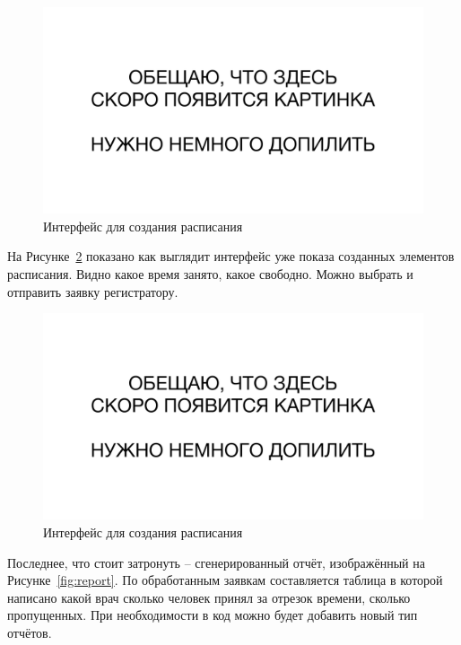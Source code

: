 \documentclass[a4paper,article]{article}
\begin{document}
\begin{sloppypar}
    \begin{figure}[h]
        \centering
        \includegraphics[width=0.8\linewidth]{UI. Пример создания расписания.png}        
        \caption{\centering Интерфейс для создания расписания}        
        \label{fig:createsched}        
    \end{figure}
    
    \newpage
    
    На Рисунке~\ref{fig:dosched} показано как выглядит интерфейс уже показа созданных элементов расписания. Видно какое время занято, какое свободно. Можно выбрать и отправить заявку регистратору.
    
    \begin{figure}[h]
        \centering
        \includegraphics[width=0.8\linewidth]{UI. Пример создания расписания.png}        
        \caption{\centering Интерфейс для создания расписания}        
        \label{fig:dosched}
    \end{figure}
    
    Последнее, что стоит затронуть -- сгенерированный отчёт, изображённый на Рисунке~\ref{fig:report}. По обработанным заявкам составляется таблица в которой написано какой врач сколько человек принял за отрезок времени, сколько пропущенных. При необходимости в код можно будет добавить новый тип отчётов.
    

\end{sloppypar}
\end{document}
